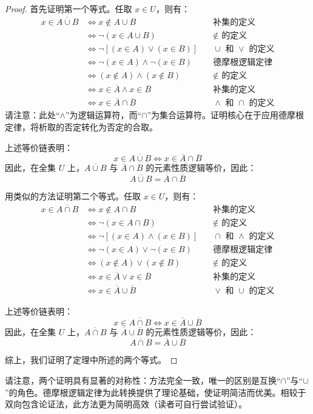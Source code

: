 \begin{proof}
    首先证明第一个等式。任取 $x \in U$，则有：
    \begin{align*}
        x \in \overline{A \cup B} &\iff x \notin A \cup B &\quad \text{补集的定义}\\
        &\iff \neg(x \in A \cup B) &\quad \notin \text{\ 的定义}\\
        &\iff \neg[(x \in A) \lor (x \in B)] &\quad \cup \text{\ 和\ } \lor \text{\ 的定义}\\
        &\iff \neg(x \in A) \land \neg(x \in B) &\quad \text{德摩根逻辑定律}\\
        &\iff (x \notin A) \land (x \notin B) &\quad \notin \text{\ 的定义}\\
        &\iff x \in \overline{A} \land x \in \overline{B} &\quad \text{补集的定义}\\
        &\iff x \in \overline{A} \cap \overline{B} &\quad \land \text{\ 和\ } \cap \text{\ 的定义}
    \end{align*}
    请注意：此处``$\land$''为逻辑运算符，而``$\cap$''为集合运算符。证明核心在于应用德摩根定律，将析取的否定转化为否定的合取。

    上述等价链表明：
    \[x \in \overline{A \cup B} \iff x \in \overline{A} \cap \overline{B}\]
    因此，在全集 $U$ 上，$\overline{A \cup B}$ 与 $\overline{A} \cap \overline{B}$ 的元素性质逻辑等价，因此：
    \[\overline{A \cup B} = \overline{A} \cap \overline{B}\]

    用类似的方法证明第二个等式。任取 $x \in U$，则有：
    \begin{align*}
        x \in \overline{A \cap B} &\iff x \notin A \cap B &\quad \text{补集的定义}\\
        &\iff \neg(x \in A \cap B) &\quad \notin \text{\ 的定义}\\
        &\iff \neg[(x \in A) \land (x \in B)] &\quad \cap \text{\ 和\ } \land \text {\ 的定义}\\
        &\iff \neg(x \in A) \lor \neg(x \in B) &\quad \text{德摩根逻辑定律}\\
        &\iff (x \notin A) \lor (x \notin B) &\quad \notin \text{\ 的定义}\\
        &\iff x \in \overline{A} \lor x \in \overline{B} &\quad \text{补集的定义}\\
        &\iff x \in \overline{A} \cup \overline{B} &\quad \lor \text{\ 和\ } \cup \text{\ 的定义}
    \end{align*}

    上述等价链表明：
    \[x \in \overline{A \cap B} \iff x \in \overline{A} \cup \overline{B}\]
    因此，在全集 $U$ 上，$\overline{A \cap B}$ 与 $\overline{A} \cup \overline{B}$ 的元素性质逻辑等价，因此：
    \[\overline{A \cap B} = \overline{A} \cup \overline{B}\]

    综上，我们证明了定理中所述的两个等式。
\end{proof}


请注意，两个证明具有显著的对称性：方法完全一致，唯一的区别是互换``$\cap$''与``$\cup$''的角色。德摩根逻辑定律为此转换提供了理论基础，使证明简洁而优美。相较于双向包含论证法，此方法更为简明高效（读者可自行尝试验证）。

\clearpage
